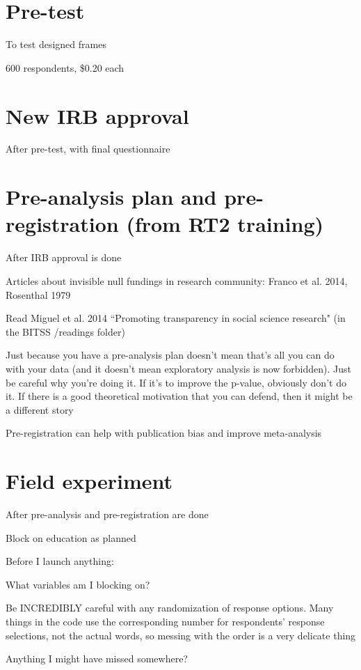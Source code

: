\section*{Pre-test}
	\begin{coi}
		\item To test designed frames
		\item 600 respondents, \$0.20 each
	\end{coi}

\section*{New IRB approval}
	\begin{coi}
		\item After pre-test, with final questionnaire
	\end{coi}

\section*{Pre-analysis plan and pre-registration (from RT2 training)}
	\begin{coi}
		\item After IRB approval is done
		\item Articles about invisible null fundings in research community: Franco et al. 2014, Rosenthal 1979
		\item Read Miguel et al. 2014 ``Promoting transparency in social science research" (in the BITSS /readings folder)
		\item Just because you have a pre-analysis plan doesn't mean that's all you can do with your data (and it doesn't mean exploratory analysis is now forbidden). Just be careful why you're doing it. If it's to improve the p-value, obviously don't do it. If there is a good theoretical motivation that you can defend, then it might be a different story
		\item Pre-registration can help with publication bias and improve meta-analysis
	\end{coi}

\section*{Field experiment}
	\begin{coi}
		\item After pre-analysis and pre-registration are done
		\item Block on education as planned
		\item Before I launch anything:
			\begin{coi}
				\item What variables am I blocking on?
				\item Be INCREDIBLY careful with any randomization of response options. Many things in the code use the corresponding number for respondents' response selections, not the actual words, so messing with the order is a very delicate thing
				\item Anything I might have missed somewhere?
			\end{coi}
	\end{coi}
	
